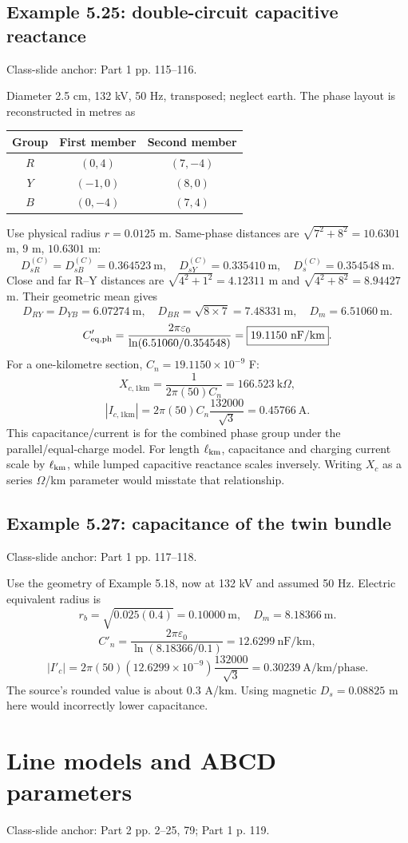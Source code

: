 \documentclass[11pt,a4paper]{article}
\newcommand{\slides}[1]{{\small\color{muted}\textsf{Class-slide anchor: #1.}}\par}
\newcommand{\chapterstart}[2]{\clearpage\section{#1}\label{#2}}
\newcommand{\ans}[1]{\boxed{#1}}
\begin{document}
\subsection{Example 5.25: double-circuit capacitive reactance}
\slides{Part 1 pp. 115--116}
Diameter 2.5 cm, 132 kV, 50 Hz, transposed; neglect earth. The phase layout is reconstructed in metres as
\begin{center}\small
\begin{tabular}{ccc}
\toprule Group & First member & Second member\\\midrule
$R$ & $(0,4)$ & $(7,-4)$\\
$Y$ & $(-1,0)$ & $(8,0)$\\
$B$ & $(0,-4)$ & $(7,4)$\\\bottomrule
\end{tabular}\end{center}
Use physical radius $r=0.0125$ m. Same-phase distances are $\sqrt{7^2+8^2}=10.6301$ m, $9$ m, $10.6301$ m:
\[
 D_{sR}^{(C)}=D_{sB}^{(C)}=0.364523\ \mathrm m,
 \quad D_{sY}^{(C)}=0.335410\ \mathrm m,
 \quad D_s^{(C)}=0.354548\ \mathrm m.
\]
Close and far R--Y distances are $\sqrt{4^2+1^2}=4.12311$ m and $\sqrt{4^2+8^2}=8.94427$ m. Their geometric mean gives
\[
 D_{RY}=D_{YB}=6.07274\ \mathrm m,\quad D_{BR}=\sqrt{8\times7}=7.48331\ \mathrm m,
 \quad D_m=6.51060\ \mathrm m.
\]
\[
 C'_{\rm eq,ph}=\frac{2\pi\varepsilon_0}{\ln(6.51060/0.354548)}
 =\ans{19.1150\ \mathrm{nF/km}}.
\]
For a one-kilometre section, $C_n=19.1150\times10^{-9}$ F:
\[
 X_{c,1\mathrm{km}}=\frac1{2\pi(50)C_n}=\ans{166.523\ \mathrm{k}\Omega},
\]
\[
 |I_{c,1\mathrm{km}}|=2\pi(50)C_n\frac{132000}{\sqrt3}
 =\ans{0.45766\ \mathrm{A}}.
\]
This capacitance/current is for the combined phase group under the parallel/equal-charge model. For length $\ell_{\rm km}$, capacitance and charging current scale by $\ell_{\rm km}$, while lumped capacitive reactance scales inversely. Writing $X_c$ as a series $\Omega$/km parameter would misstate that relationship.
\subsection{Example 5.27: capacitance of the twin bundle}
\slides{Part 1 pp. 117--118}
Use the geometry of Example 5.18, now at 132 kV and assumed 50 Hz. Electric equivalent radius is
\[
 r_b=\sqrt{0.025(0.4)}=0.10000\ \mathrm m,
 \quad D_m=8.18366\ \mathrm m.
\]
\[
 C'_n=\frac{2\pi\varepsilon_0}{\ln(8.18366/0.1)}
 =\ans{12.6299\ \mathrm{nF/km}},
\]
\[
 |I'_c|=2\pi(50)(12.6299\times10^{-9})\frac{132000}{\sqrt3}
 =\ans{0.30239\ \mathrm{A/km/phase}}.
\]
The source's rounded value is about 0.3 A/km. Using magnetic $D_s=0.08825$ m here would incorrectly lower capacitance.
\chapterstart{Line models and ABCD parameters}{models}
\slides{Part 2 pp. 2--25, 79; Part 1 p. 119}
\end{document}
